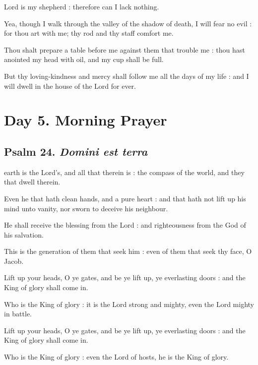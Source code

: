  Lord is my shepherd : therefore can I lack nothing.\par
{}
Yea, though I walk through the valley of the shadow of death, I will fear no evil : for thou art with me; thy rod and thy staff comfort me.\par
{}Thou shalt prepare a table before me against them that trouble me : thou hast anointed my head with oil, and my cup shall be full.\par
{}But thy loving-kindness and mercy shall follow me all the days of my life : and I will dwell in the house of the Lord for ever.\par

\section*{Day 5. Morning Prayer}

\subsection{Psalm 24. \textit{Domini est terra}}

 earth is the Lord's, and all that therein is : the compass of the world, and they that dwell therein.\par
{}
Even he that hath clean hands, and a pure heart : and that hath not lift up his mind unto vanity, nor sworn to deceive his neighbour.\par
{}He shall receive the blessing from the Lord : and righteousness from the God of his salvation.\par
{}This is the generation of them that seek him : even of them that seek thy face, O Jacob.\par
{}Lift up your heads, O ye gates, and be ye lift up, ye everlasting doors : and the King of glory shall come in.\par
{}Who is the King of glory : it is the Lord strong and mighty, even the Lord mighty in battle.\par
{}Lift up your heads, O ye gates, and be ye lift up, ye everlasting doors : and the King of glory shall come in.\par
{}Who is the King of glory : even the Lord of hosts, he is the King of glory.\par

